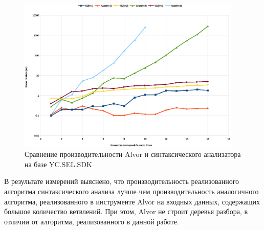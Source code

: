 \begin{figure}[h!]
 \centering
 \includegraphics[width=0.95\textwidth]{pics/AlvorVsYC.eps}
 \caption{Сравнение производительности Alvor и синтаксического анализатора на базе YC.SEL.SDK}
 \label{fig:YCvsAlvor}
\end{figure}



В результате измерений выяснено, что производительность реализованного алгоритма синтаксического анализа лучше чем производительность аналогичного алгоритма, реализованного в инструменте Alvor на входных данных, содержащих большое количество ветвлений. При этом, Alvor не строит деревья разбора, в отличии от алгоритма, реализованного в данной работе.
